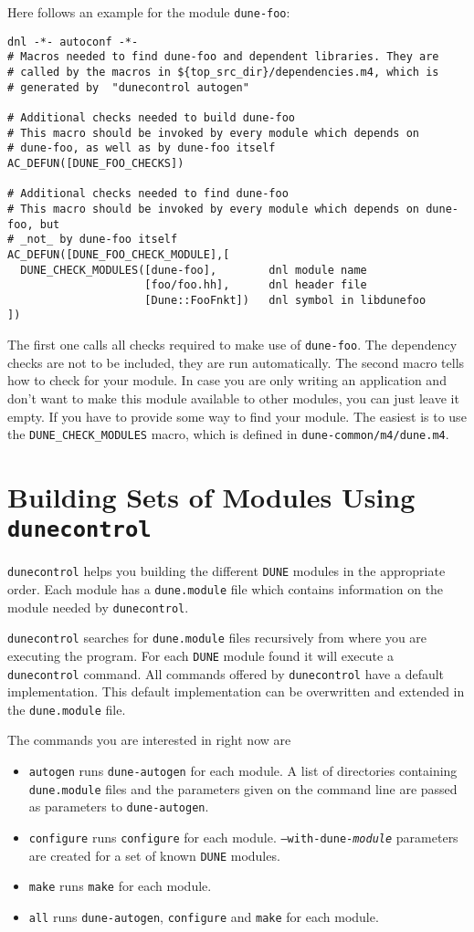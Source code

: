 \documentclass[11pt,a4paper,headinclude,footinclude,DIV16,normalheadings]{scrartcl}
\newcommand{\dune}{\texttt{DUNE}\xspace}
\newcommand{\autogen}{\texttt{dune-autogen}\xspace}
\newcommand{\configure}{\texttt{configure}\xspace}
\newcommand{\dunecontrol}{\texttt{dunecontrol}\xspace}
\newcommand{\dunemodule}{\texttt{dune.module}\xspace}
\newcommand{\make}{\texttt{make}\xspace}
\begin{document}
Here follows an example for the module \texttt{dune-foo}:

\begin{lstlisting}
dnl -*- autoconf -*-
# Macros needed to find dune-foo and dependent libraries. They are
# called by the macros in ${top_src_dir}/dependencies.m4, which is
# generated by  "dunecontrol autogen"

# Additional checks needed to build dune-foo
# This macro should be invoked by every module which depends on
# dune-foo, as well as by dune-foo itself
AC_DEFUN([DUNE_FOO_CHECKS])

# Additional checks needed to find dune-foo
# This macro should be invoked by every module which depends on dune-foo, but
# _not_ by dune-foo itself
AC_DEFUN([DUNE_FOO_CHECK_MODULE],[
  DUNE_CHECK_MODULES([dune-foo],        dnl module name
                     [foo/foo.hh],      dnl header file
                     [Dune::FooFnkt])   dnl symbol in libdunefoo
])
\end{lstlisting}

The first one calls all checks required to make use of
\texttt{dune-foo}. The dependency checks are not to be included, they
are run automatically. The second macro tells how to check for your
module. In case you are only writing an application and don't want to
make this module available to other modules, you can just leave it
empty. If you have to provide some way to find your module. The
easiest is to use the \texttt{DUNE\_CHECK\_MODULES} macro, which is
defined in \texttt{dune-common/m4/dune.m4}.

\section{Building Sets of Modules Using \dunecontrol}
\label{dunecontrol}
\dunecontrol helps you building the different \dune modules in the
appropriate order. Each module has a \dunemodule file which contains
information on the module needed by \dunecontrol. 

\dunecontrol searches for \dunemodule files recursively from where you
are executing the program. For each \dune module found it will execute
a \dunecontrol command. All commands offered by \dunecontrol have a
default implementation. This default implementation can be overwritten
and extended in the \dunemodule file.

The commands you are interested in right now are
\begin{itemize}
\item \texttt{autogen} runs \autogen for each module. A list of
  directories containing \dunemodule files and the parameters given on
  the command line are passed as parameters to \autogen.
\item \texttt{configure} runs \configure for each
  module. \texttt{--with-dune-\textit{module}} parameters are created
  for a set of known \dune modules.
\item \texttt{make} runs \make for each module.
\item \texttt{all} runs \autogen, \configure and \make for each module.
\end{itemize}
\end{document}
